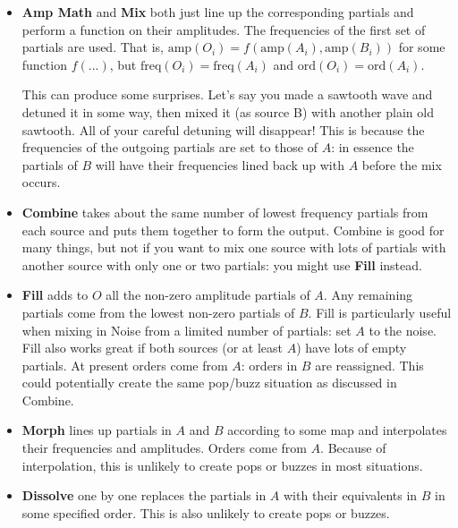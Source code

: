 \documentclass{article}
\begin{document}
\begin{itemize}
\item {\bf Amp Math} and {\bf Mix} both just line up the corresponding partials and perform a function on their amplitudes.  The frequencies of the first set of partials are used. That is, \(\text{amp}(O_i) = f(\text{amp}(A_i), \text{amp}(B_i))\) for some function \(f(...)\), but \(\text{freq}(O_i) = \text{freq}(A_i)\) and  \(\text{ord}(O_i) = \text{ord}(A_i)\).  

This can produce some surprises.  Let's say you made a sawtooth wave and detuned it in some way, then mixed it (as source B) with another plain old sawtooth.  All of your careful detuning will disappear!  This is because the frequencies of the outgoing partials are set to those of \(A\): in essence the partials of \(B\) will have their frequencies lined back up with \(A\) before the mix occurs.

\item {\bf Combine} takes about the same number of lowest frequency partials from each source and puts them together to form the output.  Combine is good for many things, but not if you want to mix one source with lots of partials with another source with only one or two partials: you might use {\bf Fill} instead.

\item {\bf Fill} adds to \(O\) all the non-zero amplitude partials of \(A\).  Any remaining partials come from the lowest non-zero partials of \(B\).  Fill is particularly useful when mixing in Noise from a limited number of partials: set \(A\) to the noise.  Fill also works great if both sources (or at least \(A\)) have lots of empty partials.  At present orders come from \(A\): orders in \(B\) are reassigned.  This could potentially create the same pop/buzz situation as discussed in Combine.

\item {\bf Morph} lines up partials in \(A\) and \(B\) according to some map and interpolates their frequencies and amplitudes.  Orders come from \(A\).  Because of interpolation, this is unlikely to create pops or buzzes in most situations.  

\item {\bf Dissolve} one by one replaces the partials in \(A\) with their equivalents in \(B\) in some specified order.  This is also unlikely to create pops or buzzes.  



\end{itemize}
\end{document}
